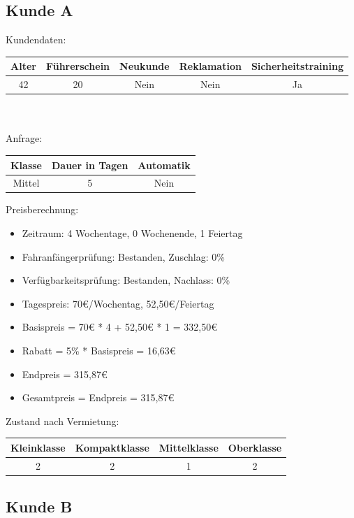\subsection{Kunde A}

Kundendaten:\\
\begin{tabular}{|c|c|c|c|c|}
	\hline \textbf{Alter} & \textbf{Führerschein} & \textbf{Neukunde} & \textbf{Reklamation} & \textbf{Sicherheitstraining} \\ 
	\hline 42 & 20 & Nein & Nein & Ja \\ 
	\hline 
\end{tabular} 
\\\\
Anfrage:\\
\begin{tabular}{|c|c|c|}
	\hline \textbf{Klasse} & \textbf{Dauer in Tagen} & \textbf{Automatik} \\ 
	\hline Mittel & 5 & Nein \\ 
	\hline 
\end{tabular}

\vspace{12pt}
Preisberechnung:
\begin{itemize}
	\item Zeitraum: 4 Wochentage, 0 Wochenende, 1 Feiertag
	\item Fahranfängerprüfung: Bestanden, Zuschlag: 0\%
	\item Verfügbarkeitsprüfung: Bestanden, Nachlass: 0\%
	\item Tagespreis: 70€/Wochentag, 52,50€/Feiertag
	\item Basispreis = 70€ * 4 + 52,50€ * 1 = 332,50€
	\item Rabatt = 5\% * Basispreis = 16,63€
	\item Endpreis = 315,87€
	\item Gesamtpreis = Endpreis = 315,87€
\end{itemize}

Zustand nach Vermietung:\\
\begin{tabular}{|c|c|c|c|}
	\hline \textbf{Kleinklasse} & \textbf{Kompaktklasse} & \textbf{Mittelklasse} & \textbf{Oberklasse}  \\ 
	\hline 2 & 2 & 1 & 2 \\ 
	\hline 
\end{tabular} 

\subsection{Kunde B}

